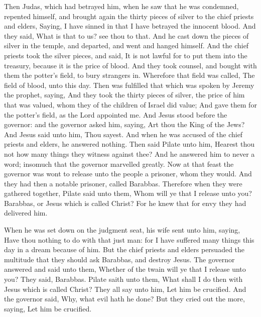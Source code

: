  Then Judas, which had betrayed him, when he saw that he
was condemned, repented himself, and brought again the thirty pieces of
silver to the chief priests and elders,  Saying, I have
sinned in that I have betrayed the innocent blood. And they said, What
is that to us? see thou to that.  And he cast down the
pieces of silver in the temple, and departed, and went and hanged
himself.  And the chief priests took the silver pieces,
and said, It is not lawful for to put them into the treasury, because it
is the price of blood.  And they took counsel, and bought
with them the potter's field, to bury strangers in. 
Wherefore that field was called, The field of blood, unto this day.
 Then was fulfilled that which was spoken by Jeremy the
prophet, saying, And they took the thirty pieces of silver, the price of
him that was valued, whom they of the children of Israel did value;
 And gave them for the potter's field, as the Lord
appointed me.  And Jesus stood before the governor: and
the governor asked him, saying, Art thou the King of the Jews? And Jesus
said unto him, Thou sayest.  And when he was accused of
the chief priests and elders, he answered nothing.  Then
said Pilate unto him, Hearest thou not how many things they witness
against thee?  And he answered him to never a word;
insomuch that the governor marvelled greatly.  Now at
that feast the governor was wont to release unto the people a prisoner,
whom they would.  And they had then a notable prisoner,
called Barabbas.  Therefore when they were gathered
together, Pilate said unto them, Whom will ye that I release unto you?
Barabbas, or Jesus which is called Christ?  For he knew
that for envy they had delivered him.

 When he was set down on the judgment seat, his wife sent
unto him, saying, Have thou nothing to do with that just man: for I have
suffered many things this day in a dream because of him. 
But the chief priests and elders persuaded the multitude that they
should ask Barabbas, and destroy Jesus.  The governor
answered and said unto them, Whether of the twain will ye that I release
unto you? They said, Barabbas.  Pilate saith unto them,
What shall I do then with Jesus which is called Christ? They all say
unto him, Let him be crucified.  And the governor said,
Why, what evil hath he done? But they cried out the more, saying, Let
him be crucified.

